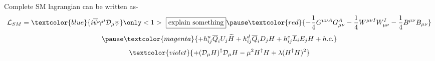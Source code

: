 \documentclass{beamer}
\begin{document}
    \begin{frame}
        Complete SM lagrangian can be written as-
        \[\mathcal{L}_{SM}=\textcolor{blue}{i\overline{\psi}\gamma^{\mu}\mathcal{D}_{\mu}\psi}\only<1>{~\fbox{explain something}}\pause
        \textcolor{red}{ -\frac{1}{4}G^{\mu\nu A}G_{\mu\nu}^{A}-\frac{1}{4}W^{\mu\nu I}W_{\mu\nu}^{I}-\frac{1}{4}B^{\mu\nu}B_{\mu\nu}}\]
        \[\pause\textcolor{magenta}{+h_{ij}^{u}\overline{Q}_{i}U_{j} \widetilde{H}+h_{ij}^{d}\overline{Q}_{i} D_{j}H+h_{ij}^{e}\overline{L}_{i}E_{j}H+h.c.}\]
        \pause
        \begin{equation}
        \textcolor{violet}{+(\mathcal{D}_{\mu}H)^{\dag}\mathcal{D}_{\mu}H-\mu^{2}H^{\dag}H+\lambda(H^{\dag}H)^{2}}
        \end{equation}
    \end{frame} 
\end{document}
